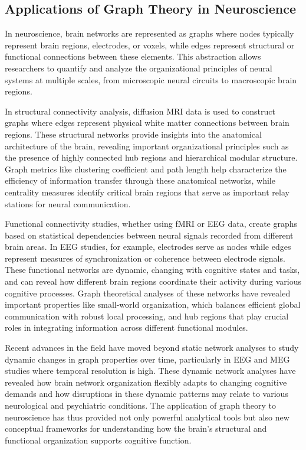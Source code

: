 \subsection*{Applications of Graph Theory in Neuroscience}
In neuroscience, brain networks are represented as graphs where nodes typically represent brain regions, electrodes, or voxels, while edges represent structural or functional connections between these elements. This abstraction allows researchers to quantify and analyze the organizational principles of neural systems at multiple scales, from microscopic neural circuits to macroscopic brain regions.

In structural connectivity analysis, diffusion MRI data is used to construct graphs where edges represent physical white matter connections between brain regions. These structural networks provide insights into the anatomical architecture of the brain, revealing important organizational principles such as the presence of highly connected hub regions and hierarchical modular structure. Graph metrics like clustering coefficient and path length help characterize the efficiency of information transfer through these anatomical networks, while centrality measures identify critical brain regions that serve as important relay stations for neural communication.

Functional connectivity studies, whether using fMRI or EEG data, create graphs based on statistical dependencies between neural signals recorded from different brain areas. In EEG studies, for example, electrodes serve as nodes while edges represent measures of synchronization or coherence between electrode signals. These functional networks are dynamic, changing with cognitive states and tasks, and can reveal how different brain regions coordinate their activity during various cognitive processes. Graph theoretical analyses of these networks have revealed important properties like small-world organization, which balances efficient global communication with robust local processing, and hub regions that play crucial roles in integrating information across different functional modules.

Recent advances in the field have moved beyond static network analyses to study dynamic changes in graph properties over time, particularly in EEG and MEG studies where temporal resolution is high. These dynamic network analyses have revealed how brain network organization flexibly adapts to changing cognitive demands and how disruptions in these dynamic patterns may relate to various neurological and psychiatric conditions. The application of graph theory to neuroscience has thus provided not only powerful analytical tools but also new conceptual frameworks for understanding how the brain's structural and functional organization supports cognitive function.


